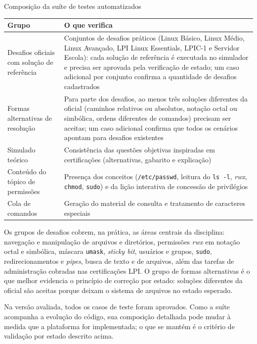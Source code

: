 \begin{quadro}[htbp]
    \caption{Composição da suíte de testes automatizados}
    \label{qua:suite-testes}
    \footnotesize
    \begin{tabularx}{\textwidth}{|p{4.2cm}|L|}
        \hline
        \textbf{Grupo} & \textbf{O que verifica} \\
        \hline
        Desafios oficiais com solução de referência & Conjuntos de desafios práticos (Linux Básico, Linux Médio, Linux Avançado, LPI Linux Essentials, LPIC-1 e Servidor Escola): cada solução de referência é executada no simulador e precisa ser aprovada pela verificação de estado; um caso adicional por conjunto confirma a quantidade de desafios cadastrados \\
        \hline
        Formas alternativas de resolução & Para parte dos desafios, ao menos três soluções diferentes da oficial (caminhos relativos ou absolutos, notação octal ou simbólica, ordens diferentes de comandos) precisam ser aceitas; um caso adicional confirma que todos os cenários apontam para desafios existentes \\
        \hline
        Simulado teórico & Consistência das questões objetivas inspiradas em certificações (alternativas, gabarito e explicação) \\
        \hline
        Conteúdo do tópico de permissões & Presença dos conceitos (\texttt{/etc/passwd}, leitura do \texttt{ls -l}, \textit{rwx}, \texttt{chmod}, \texttt{sudo}) e da lição interativa de concessão de privilégios \\
        \hline
        Cola de comandos & Geração do material de consulta e tratamento de caracteres especiais \\
        \hline
    \end{tabularx}
\end{quadro}

Os grupos de desafios cobrem, na prática, as áreas centrais da disciplina: navegação e manipulação de arquivos e diretórios, permissões \textit{rwx} em notação octal e simbólica, máscara \texttt{umask}, \textit{sticky bit}, usuários e grupos, \texttt{sudo}, redirecionamentos e \textit{pipes}, busca de texto e de arquivos, além das tarefas de administração cobradas nas certificações LPI. O grupo de formas alternativas é o que melhor evidencia o princípio de correção por estado: soluções diferentes da oficial são aceitas porque deixam o sistema de arquivos no estado esperado.

Na versão avaliada, todos os casos de teste foram aprovados. Como a suíte acompanha a evolução do código, sua composição detalhada pode mudar à medida que a plataforma for implementada; o que se mantém é o critério de validação por estado descrito acima.

